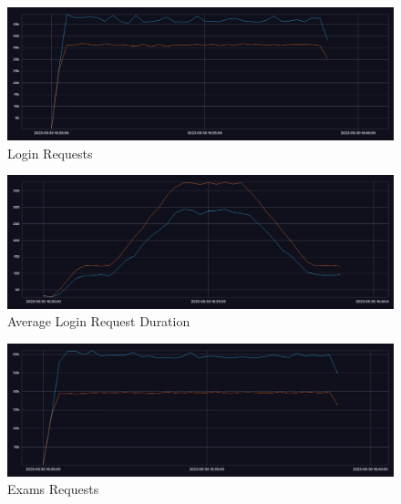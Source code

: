 \documentclass[BIF,Bachelor,nenglish]{twbook}%
\begin{document}
\begin{figure} [H]
 \begin{center}
    \includegraphics[width=1\linewidth]{img/Users_Requests_15s_Compare.png}
 \end{center}
 \caption{Login Requests}
 \label{loginRequests}
\end{figure}

\begin{figure} [H]
 \begin{center}
    \includegraphics[width=1\linewidth]{img/Users_Duration_15s_Compare.png}
 \end{center}
 \caption{Average Login Request Duration}
 \label{loginDuration}
\end{figure}


\begin{figure} [H]
 \begin{center}
    \includegraphics[width=1\linewidth]{img/Exams_Requests_15s_Compare.png}
 \end{center}
 \caption{Exams Requests}
 \label{examsRequests}
\end{figure}
\end{document}
